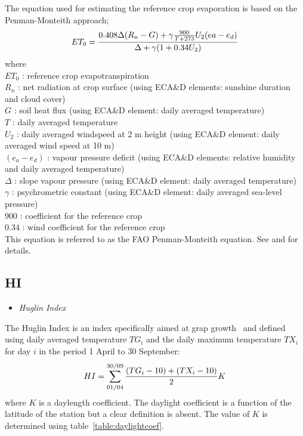 \documentclass[a4paper,11pt]{article}
\begin{document}
The equation used for estimating the reference crop evaporation is based on the Penman-Monteith approach;
\begin{equation}
ET_0 = \frac{0.408 \Delta (R_n - G) + \gamma \frac{900}{T + 273} U_2 ( ea - e_d)}{\Delta + \gamma ( 1 + 0.34 U_2) } \notag
\end{equation}
where\\
$ET_0$ : reference crop evapotranspiration\\
$R_n$ : net radiation at crop surface (using ECA\&D elements: sunshine duration and cloud cover)\\
$G$ : soil heat flux (using ECA\&D element: daily averaged temperature)\\
$T$ : daily averaged temperature\\
$U_2$ : daily averaged windspeed at 2 m height (using ECA\&D element: daily averaged wind speed at 10 m)\\
$(e_a - e_d)$ : vapour pressure deficit (using ECA\&D elements: relative humidity and daily averaged temperature) \\
$\Delta$ : slope vapour pressure (using ECA\&D element: daily averaged temperature)\\
$\gamma$ : psychrometric constant (using ECA\&D element: daily averaged sea-level pressure)\\
$900$ : coefficient for the reference crop\\
$0.34$ : wind coefficient for the reference crop\\
This equation is referred to as the FAO Penman-Monteith equation. See \citet{allen:94a} and \citet{allen:94b}
for details.

\subsection*{HI}
\begin{itemize}
\item \textit{Huglin Index}
\end{itemize}
The Huglin Index is an index specifically aimed at grap growth~\citep{huglin:78} and defined 
using daily averaged temperature $TG_i$ and the daily maximum
temperature $TX_i$ for day $i$ in the period 1 April to 30 September:
\begin{equation}
HI = \sum_{01/04}^{30/09} \frac{(TG_i - 10) + (TX_i- 10)}{2} K \notag
\end{equation}
where $K$ is a daylength coefficient. The daylight coefficient is a function of the latitude of the station
but a  clear definition is absent. The value of $K$ is determined using table~\ref{table:daylightcoef}.
\end{document}
